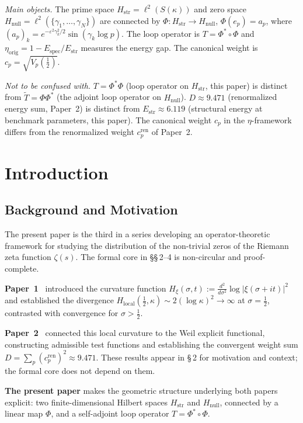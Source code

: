\documentclass[11pt]{article}
\newcommand{\Hstr}{H_{\mathrm{str}}}
\newcommand{\Hnull}{H_{\mathrm{null}}}
\newcommand{\Estr}{E_{\mathrm{str}}}
\newcommand{\Espec}{E_{\mathrm{spec}}}
\newcommand{\etaorig}{\eta_{\mathrm{orig}}}
\newcommand{\Hlocal}{H_{\mathrm{local}}}
\newcommand{\cren}{c_p^{\mathrm{ren}}}
\begin{document}
\medskip
\emph{Main objects.}
The prime space $\Hstr=\ell^2(S(\kappa))$ and zero space
$\Hnull=\ell^2(\{\gamma_1,\ldots,\gamma_N\})$ are connected by
$\Phi\colon\Hstr\to\Hnull$, $\Phi(e_p)=a_p$, where
$(a_p)_k=e^{-\varepsilon^2\gamma_k^2/2}\sin(\gamma_k\log p)$.
The loop operator is $T=\Phi^*\circ\Phi$ and
$\etaorig=1-\Espec/\Estr$ measures the energy gap.
The canonical weight is $c_p=\sqrt{V_p(\tfrac12)}$.

\medskip
\emph{Not to be confused with.}
$T=\Phi^*\Phi$ (loop operator on $\Hstr$, this paper) is distinct from
$\tilde T=\Phi\Phi^*$ (the adjoint loop operator on $\Hnull$).
$D\approx 9.471$ (renormalized energy sum, Paper~2) is distinct from
$\Estr\approx 6.119$ (structural energy at benchmark parameters,
this paper). The canonical weight
$c_p$ in the $\eta$-framework differs from the renormalized weight
$\cren$ of Paper~2.

\newpage

\section{Introduction}

\subsection{Background and Motivation}

The present paper is the third in a series developing an
operator-theoretic framework for studying the distribution of the
non-trivial zeros of the Riemann zeta function $\zeta(s)$.
The formal core in \S\S\,2--4 is non-circular and proof-complete.

\textbf{Paper~1}~\cite{Paper1} introduced the curvature function
$H_{\xi}(\sigma,t) := \frac{d^2}{d\sigma^2}\log|\xi(\sigma+it)|^2$
and established the divergence
$\Hlocal(\tfrac12,\kappa)\sim 2(\log\kappa)^2\to\infty$ at
$\sigma=\tfrac12$, contrasted with convergence for $\sigma>\tfrac12$.

\textbf{Paper~2}~\cite{Paper2} connected this local curvature to the
Weil explicit functional, constructing admissible test functions
and establishing the convergent weight sum
$D=\sum_p(c_p^{\mathrm{ren}})^2\approx 9.471$.
These results appear in \S\,2 for motivation and context;
the formal core does not depend on them.

\textbf{The present paper} makes the geometric structure underlying
both papers explicit: two finite-dimensional Hilbert spaces $\Hstr$
and $\Hnull$, connected by a linear map $\Phi$, and a self-adjoint
loop operator $T=\Phi^*\circ\Phi$.
\end{document}
